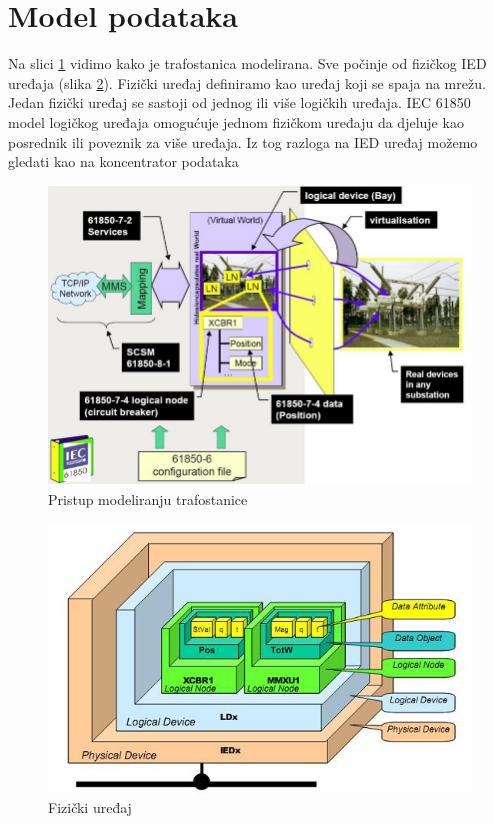 \documentclass[times, utf8, zavrsni]{fer}
\begin{document}
\section{Model podataka}
Na slici \ref{fig:iec-model-approach} vidimo kako je trafostanica modelirana. Sve počinje od fizičkog IED uređaja (slika \ref{fig:iec-physical-device}). Fizički uređaj definiramo kao uređaj koji se spaja na mrežu. Jedan fizički uređaj se sastoji od jednog ili više logičkih uređaja. IEC 61850 model logičkog uređaja omogućuje jednom fizičkom uređaju da djeluje kao posrednik  ili poveznik  za više uređaja. Iz tog razloga na IED uređaj možemo gledati kao na koncentrator podataka \citep{baigent2004iec}

\begin{figure}[tph]
    \centering
    \includegraphics[scale=0.45]{img/IEC61850-model-approach.jpg}
    \caption{Pristup modeliranju trafostanice\footnotemark}
    \label{fig:iec-model-approach}
\end{figure}

\begin{figure}[tph]
    \centering
    \includegraphics[scale=0.75]{img/IEC61850-physical-device.jpg}
    \caption{Fizički uređaj\footnotemark}
    \label{fig:iec-physical-device}
\end{figure}
\end{document}
